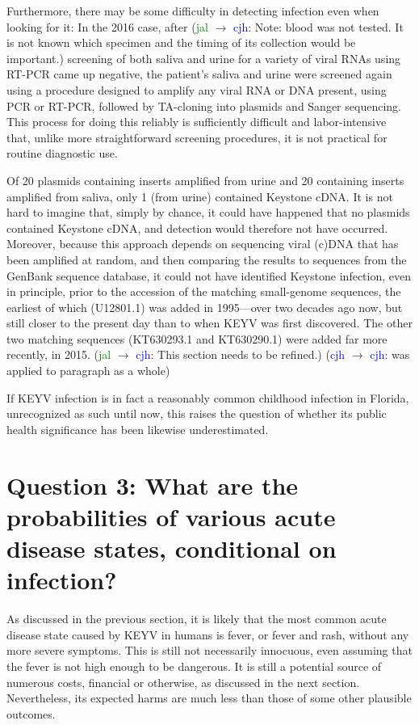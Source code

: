 \documentclass[12pt]{article}
\newcommand{\cjh}{\textcolor{blue}{cjh}}
\newcommand{\jal}{\textcolor{green}{jal}}
\newcommand{\msg}[3]{(#1 $\rightarrow$ #2: #3)}
\newcommand{\mcc}[1]{\msg\cjh\cjh{#1}}
\newcommand{\mjc}[1]{\msg\jal\cjh{#1}}
\begin{document}
            Furthermore, there may be some difficulty in detecting infection even when looking for it: In the 2016 case, after \mjc{Note: blood was not tested. It is not known which specimen and the timing of its collection would be important.} screening of both saliva and urine for a variety of viral RNAs using RT-PCR came up negative, the patient's saliva and urine were screened again using a procedure designed to amplify any viral RNA or DNA present, using PCR or RT-PCR, followed by TA-cloning into plasmids and Sanger sequencing\cite{lednicky2018keystone}. This process for doing this reliably is sufficiently difficult and labor-intensive that, unlike more straightforward screening procedures, it is not practical for routine diagnostic use.\cite{lednicky2019personal}

            Of 20 plasmids containing inserts amplified from urine and 20 containing inserts amplified from saliva, only 1 (from urine) contained Keystone cDNA. It is not hard to imagine that, simply by chance, it could have happened that no plasmids contained Keystone cDNA, and detection would therefore not have occurred. Moreover, because this approach depends on sequencing viral (c)DNA that has been amplified at random, and then comparing the results to sequences from the GenBank sequence database, it could not have identified Keystone infection, even in principle, prior to the accession of the matching small-genome sequences, the earliest of which (U12801.1) was added in 1995\cite{genbankU12801.1}---over two decades ago now, but still closer to the present day than to when KEYV was first discovered. The other two matching sequences (KT630293.1 and KT630290.1) were added far more recently, in 2015\cite{genbankKT630293.1,genbankKT630290.1}. \mjc{This section needs to be refined.} \mcc{was applied to paragraph as a whole}

            If KEYV infection is in fact a reasonably common childhood infection in Florida, unrecognized as such until now, this raises the question of whether its public health significance has been likewise underestimated.


    \section[Probabilities of disease, given infection]{Question 3: What are the probabilities of various acute disease states, conditional on infection?}
        \label{probabilities}
        As discussed in the previous section, it is likely that the most common acute disease state caused by KEYV in humans is fever, or fever and rash, without any more severe symptoms. This is still not necessarily innocuous, even assuming that the fever is not high enough to be dangerous. It is still a potential source of numerous costs, financial or otherwise, as discussed in the next section. Nevertheless, its expected harms are much less than those of some other plausible outcomes.
\end{document}
